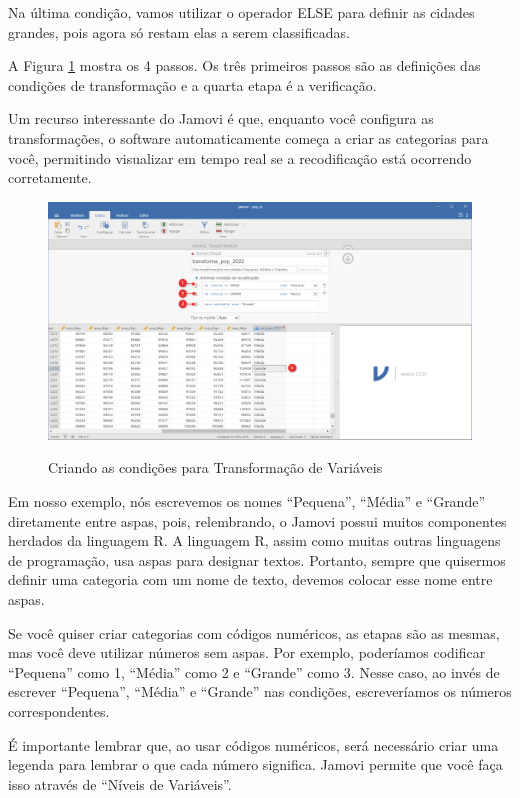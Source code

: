 Na última condição, vamos utilizar o operador ELSE para definir as cidades grandes, pois agora só restam elas a serem classificadas. 

A Figura \ref{fig:criar_categoria_jamovi_6} mostra os 4 passos. Os três primeiros passos são as definições das condições de transformação e a quarta etapa é a verificação.

Um recurso interessante do Jamovi é que, enquanto você configura as transformações, o software automaticamente começa a criar as categorias para você, permitindo visualizar em tempo real se a recodificação está ocorrendo corretamente. 

\begin{figure}[H]
    \centering
    \caption{Criando as condições para Transformação de Variáveis}
    \includegraphics[width=\textwidth]{imagens/cap_2/criar_categoria_jamovi_6.png}
    \label{fig:criar_categoria_jamovi_6}
\end{figure}

Em nosso exemplo, nós escrevemos os nomes ``Pequena'', ``Média'' e ``Grande'' diretamente entre aspas, pois, relembrando, o Jamovi possui muitos componentes herdados da linguagem R. A linguagem R, assim como muitas outras linguagens de programação, usa aspas para designar textos. Portanto, sempre que quisermos definir uma categoria com um nome de texto, devemos colocar esse nome entre aspas.

Se você quiser criar categorias com códigos numéricos, as etapas são as mesmas, mas você deve utilizar números sem aspas. Por exemplo, poderíamos codificar ``Pequena'' como 1, ``Média'' como 2 e ``Grande'' como 3. Nesse caso, ao invés de escrever ``Pequena'', ``Média'' e ``Grande'' nas condições, escreveríamos os números correspondentes.

É importante lembrar que, ao usar códigos numéricos, será necessário criar uma legenda para lembrar o que cada número significa. Jamovi permite que você faça isso através de ``Níveis de Variáveis''.

